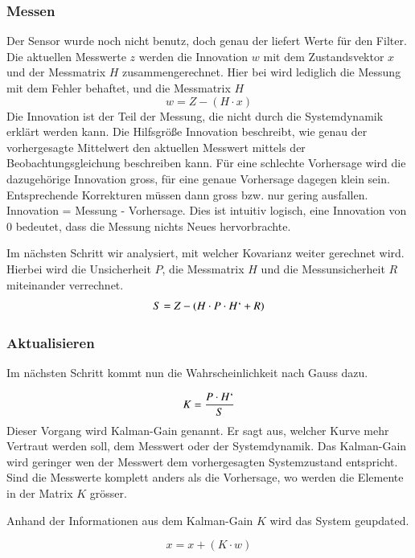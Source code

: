 \subsubsection*{Messen}
Der Sensor wurde noch nicht benutz, doch genau der liefert Werte für den Filter. Die aktuellen Messwerte $z$ werden die Innovation $w$ mit dem Zustandsvektor $x$ und der Messmatrix $H$ zusammengerechnet.
Hier bei wird lediglich die Messung mit dem Fehler behaftet, und die Messmatrix $H$ 
\begin{equation}
w=Z-(H\cdot x)
\end{equation}
Die Innovation ist der Teil der Messung, die nicht durch die Systemdynamik erklärt werden kann. Die Hilfsgröße Innovation beschreibt, wie genau der vorhergesagte Mittelwert den aktuellen Messwert mittels der Beobachtungsgleichung beschreiben kann. Für eine schlechte Vorhersage wird die dazugehörige Innovation gross, für eine genaue Vorhersage dagegen klein sein. Entsprechende Korrekturen müssen dann gross bzw. nur gering ausfallen. Innovation = Messung - Vorhersage. Dies ist intuitiv logisch, eine Innovation von 0 bedeutet, dass die Messung nichts Neues hervorbrachte.

Im nächsten Schritt wir analysiert, mit welcher Kovarianz weiter gerechnet wird. 
Hierbei wird die Unsicherheit $P$, die Messmatrix $H$ und die Messunsicherheit $R$ miteinander verrechnet. 
\begin{equation}
S=Z-(H\cdot P\cdot H`+R)
\end{equation}


\subsubsection*{Aktualisieren}
Im nächsten Schritt kommt nun die Wahrscheinlichkeit nach Gauss dazu. 

\begin{equation}
K= \frac{P \cdot H`}S
\end{equation}
Dieser Vorgang wird Kalman-Gain genannt. Er sagt aus, welcher Kurve mehr Vertraut werden soll, dem Messwert oder der Systemdynamik.
Das Kalman-Gain wird geringer wen der Messwert dem vorhergesagten Systemzustand entspricht. Sind die Messwerte komplett anders als die Vorhersage, wo werden die Elemente in der Matrix $K$ grösser.

Anhand der Informationen aus dem Kalman-Gain $K$ wird das System geupdated.

\begin{equation}
x=x+(K \cdot w) 
\end{equation}

